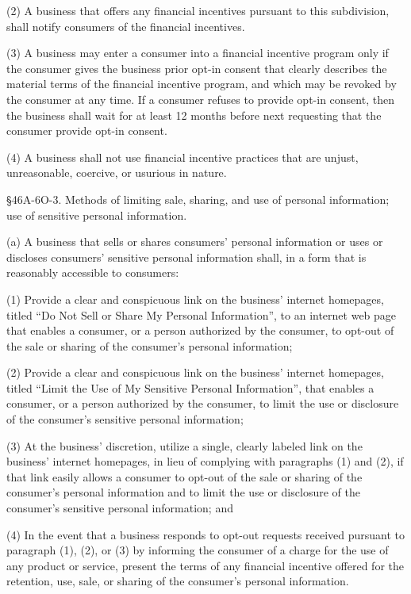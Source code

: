 (2) A business that offers any financial incentives pursuant to this subdivision, shall notify consumers of the financial incentives.

(3) A business may enter a consumer into a financial incentive program only if the consumer gives the business prior opt-in consent that clearly describes the material terms of the financial incentive program, and which may be revoked by the consumer at any time. If a consumer refuses to provide opt-in consent, then the business shall wait for at least 12 months before next requesting that the consumer provide opt-in consent.

(4) A business shall not use financial incentive practices that are unjust, unreasonable, coercive, or usurious in nature.

§46A-6O-3. Methods of limiting sale, sharing, and use of personal information; use of sensitive personal information.


(a) A business that sells or shares consumers’ personal information or uses or discloses consumers’ sensitive personal information shall, in a form that is reasonably accessible to consumers:

(1) Provide a clear and conspicuous link on the business’ internet homepages, titled “Do Not Sell or Share My Personal Information”, to an internet web page that enables a consumer, or a person authorized by the consumer, to opt-out of the sale or sharing of the consumer’s personal information;

(2) Provide a clear and conspicuous link on the business’ internet homepages, titled “Limit the Use of My Sensitive Personal Information”, that enables a consumer, or a person authorized by the consumer, to limit the use or disclosure of the consumer’s sensitive personal information;

(3) At the business’ discretion, utilize a single, clearly labeled link on the business’ internet homepages, in lieu of complying with paragraphs (1) and (2), if that link easily allows a consumer to opt-out of the sale or sharing of the consumer’s personal information and to limit the use or disclosure of the consumer’s sensitive personal information; and

(4) In the event that a business responds to opt-out requests received pursuant to paragraph (1), (2), or (3) by informing the consumer of a charge for the use of any product or service, present the terms of any financial incentive offered for the retention, use, sale, or sharing of the consumer’s personal information.

